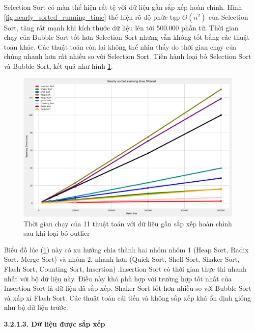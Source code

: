 Selection Sort có màn thể hiện rất tệ với dữ liệu gần sắp xếp hoàn chỉnh. Hình \ref{fig:nearly_sorted_running_time} thể hiện rõ độ phức tạp $O(n^2)$ của Selection Sort, tăng rất mạnh khi kích thước dữ liệu lên tới 500.000 phần tử. Thời gian chạy của Bubble Sort tốt hơn Selection Sort nhưng vẫn không tốt bằng các thuật toán khác. Các thuật toán còn lại không thể nhìn thấy do thời gian chạy của chúng nhanh hơn rất nhiều so với Selection Sort. Tiến hành loại bỏ Selection Sort và Bubble Sort, kết quả như hình \ref{fig:nearly_sorted_running_time_filtered}.


\begin{figure}[H]
    \centering
    \includegraphics[width=\textwidth]{experimental_result/images/nearly_sorted_running_time_filtered.png}
    \caption{Thời gian chạy của 11 thuật toán với dữ liệu gần sắp xếp hoàn chỉnh sau khi loại bỏ outlier}
    \label{fig:nearly_sorted_running_time_filtered}
\end{figure}

Biểu đồ lúc (\ref{fig:nearly_sorted_running_time_filtered}) này có xu hướng chia thành hai nhóm nhóm 1 (Heap Sort, Radix Sort, Merge Sort) và nhóm 2, nhanh hơn (Quick Sort, Shell Sort, Shaker Sort, Flash Sort, Counting Sort, Insertion) .Insertion Sort có thời gian thực thi nhanh nhất với bộ dữ liệu này. Điều này khá phù hợp với trường hợp tốt nhất của Insertion Sort là dữ liệu đã sắp xếp. Shaker Sort tốt hơn nhiều so với Bubble Sort và xấp xỉ Flash Sort. Các thuật toán cải tiến và không sắp xếp khá ổn định giống như bộ dữ liệu trước.


\textbf{3.2.1.3. Dữ liệu được sắp xếp}


